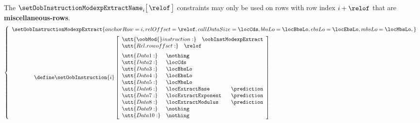 \saNote{} The $\setOobInstructionModexpExtractName _{i} \big[ \, \relof \, \big]$ constraints may only be used on rows with row index $i + \relof$ that are \textbf{miscellaneous-rows}.
\[
        \left\{ \begin{array}{l}
                \setOobInstructionModexpExtract {
                        anchorRow    = i         ,
                        relOffset    = \relof    ,
                        callDataSize = \locCds   ,
                        bbsLo        = \locBbsLo ,
                        ebsLo        = \locEbsLo ,
                        mbsLo        = \locMbsLo ,
                        }
                \vspace{2mm} \\
                \qquad \qquad \define
                \setOobInstruction{i}
                \left[ \begin{array}{llr}
                        \multicolumn{3}{l}{\utt{\oobMod{} instruction:} \quad \oobInstModexpExtract} \\
                        \multicolumn{3}{l}{\utt{Rel. row offset:}       \quad \relof} \vspace{2mm}   \\
                        \utt{Data 1:}  & \nothing            \\
                        \utt{Data 2:}  & \locCds             \\
                        \utt{Data 3:}  & \locBbsLo           \\
                        \utt{Data 4:}  & \locEbsLo           \\
                        \utt{Data 5:}  & \locMbsLo           \\
                        \utt{Data 6:}  & \locExtractBase      & \prediction \\
                        \utt{Data 7:}  & \locExtractExponent  & \prediction \\
                        \utt{Data 8:}  & \locExtractModulus   & \prediction \\
                        \utt{Data 9:}  & \nothing            \\
                        \utt{Data 10:} & \nothing            \\
                \end{array} \right] \\
        \end{array} \right.
\]
